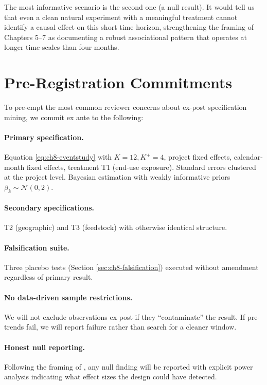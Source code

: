 \documentclass[11pt,a4paper]{article}
\begin{document}
The most informative scenario is the second one (a null result). It would tell us that even a clean natural experiment with a meaningful treatment cannot identify a causal effect on this short time horizon, strengthening the framing of Chapters 5--7 as documenting a robust associational pattern that operates at longer time-scales than four months.

\section{Pre-Registration Commitments}
\label{sec:ch8-prereg}

To pre-empt the most common reviewer concerns about ex-post specification mining, we commit ex ante to the following:

\paragraph{Primary specification.} Equation \eqref{eq:ch8-eventstudy} with $K = 12, K^+ = 4$, project fixed effects, calendar-month fixed effects, treatment T1 (end-use exposure). Standard errors clustered at the project level. Bayesian estimation with weakly informative priors $\beta_k \sim \mathcal{N}(0, 2)$.

\paragraph{Secondary specifications.} T2 (geographic) and T3 (feedstock) with otherwise identical structure.

\paragraph{Falsification suite.} Three placebo tests (Section \ref{sec:ch8-falsification}) executed without amendment regardless of primary result.

\paragraph{No data-driven sample restrictions.} We will not exclude observations ex post if they ``contaminate'' the result. If pre-trends fail, we will report failure rather than search for a cleaner window.

\paragraph{Honest null reporting.} Following the framing of \citet{ketel2023unimportance}, any null finding will be reported with explicit power analysis indicating what effect sizes the design could have detected.
\end{document}

